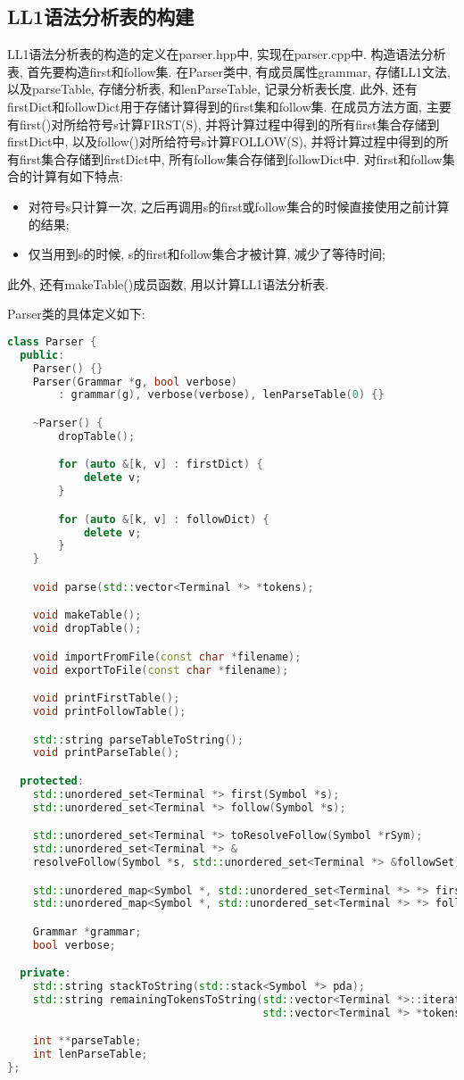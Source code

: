 \subsection{LL1语法分析表的构建}
LL1语法分析表的构造的定义在parser.hpp中, 实现在parser.cpp中. 构造语法分析表,
首先要构造first和follow集. 在Parser类中, 有成员属性grammar, 存储LL1文法,
以及parseTable, 存储分析表, 和lenParseTable, 记录分析表长度. 此外,
还有firstDict和followDict用于存储计算得到的first集和follow集. 在成员方法方面,
主要有first()对所给符号s计算FIRST(S),
并将计算过程中得到的所有first集合存储到firstDict中,
以及follow()对所给符号s计算FOLLOW(S),
并将计算过程中得到的所有first集合存储到firstDict中,
所有follow集合存储到followDict中. 对first和follow集合的计算有如下特点:
\begin{itemize}
	\item 对符号s只计算一次,
	      之后再调用s的first或follow集合的时候直接使用之前计算的结果;
	\item 仅当用到s的时候, s的first和follow集合才被计算, 减少了等待时间;
\end{itemize}
此外, 还有makeTable()成员函数, 用以计算LL1语法分析表.\par

Parser类的具体定义如下:
\begin{lstlisting}[language=c++]
class Parser {
  public:
    Parser() {}
    Parser(Grammar *g, bool verbose)
        : grammar(g), verbose(verbose), lenParseTable(0) {}

    ~Parser() {
        dropTable();

        for (auto &[k, v] : firstDict) {
            delete v;
        }

        for (auto &[k, v] : followDict) {
            delete v;
        }
    }

    void parse(std::vector<Terminal *> *tokens);

    void makeTable();
    void dropTable();

    void importFromFile(const char *filename);
    void exportToFile(const char *filename);

    void printFirstTable();
    void printFollowTable();

    std::string parseTableToString();
    void printParseTable();

  protected:
    std::unordered_set<Terminal *> first(Symbol *s);
    std::unordered_set<Terminal *> follow(Symbol *s);

    std::unordered_set<Terminal *> toResolveFollow(Symbol *rSym);
    std::unordered_set<Terminal *> &
    resolveFollow(Symbol *s, std::unordered_set<Terminal *> &followSet);

    std::unordered_map<Symbol *, std::unordered_set<Terminal *> *> firstDict;
    std::unordered_map<Symbol *, std::unordered_set<Terminal *> *> followDict;

    Grammar *grammar;
    bool verbose;

  private:
    std::string stackToString(std::stack<Symbol *> pda);
    std::string remainingTokensToString(std::vector<Terminal *>::iterator it,
                                        std::vector<Terminal *> *tokens);

    int **parseTable;
    int lenParseTable;
};
\end{lstlisting}


